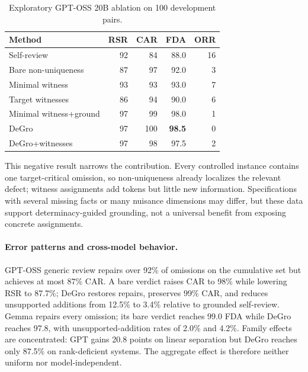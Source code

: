 \documentclass[sigconf,anonymous]{aamas}
\begin{document}
\begin{table}[t]
\centering
\caption{Exploratory GPT-OSS 20B ablation on 100 development pairs.}
\label{tab:ablation}
\small
\begin{tabular}{lrrrr}
\toprule
Method & RSR & CAR & FDA & ORR\\
\midrule
Self-review & 92 & 84 & 88.0 & 16\\
Bare non-uniqueness & 87 & 97 & 92.0 & 3\\
Minimal witness & 93 & 93 & 93.0 & 7\\
Target witnesses & 86 & 94 & 90.0 & 6\\
Minimal witness+ground & 97 & 99 & 98.0 & 1\\
DeGro & 97 & 100 & \textbf{98.5} & 0\\
DeGro+witnesses & 97 & 98 & 97.5 & 2\\
\bottomrule
\end{tabular}
\end{table}

This negative result narrows the contribution.  Every controlled instance contains one target-critical omission, so non-uniqueness already localizes the relevant defect; witness assignments add tokens but little new information.  Specifications with several missing facts or many nuisance dimensions may differ, but these data support determinacy-guided grounding, not a universal benefit from exposing concrete assignments.

\paragraph{Error patterns and cross-model behavior.}
GPT-OSS generic review repairs over 92\% of omissions on the cumulative set but achieves at most 87\% CAR.  A bare verdict raises CAR to 98\% while lowering RSR to 87.7\%; DeGro restores repairs, preserves 99\% CAR, and reduces unsupported additions from 12.5\% to 3.4\% relative to grounded self-review.  Gemma repairs every omission; its bare verdict reaches 99.0 FDA while DeGro reaches 97.8, with unsupported-addition rates of 2.0\% and 4.2\%.  Family effects are concentrated: GPT gains 20.8 points on linear separation but DeGro reaches only 87.5\% on rank-deficient systems.  The aggregate effect is therefore neither uniform nor model-independent.
\end{document}
